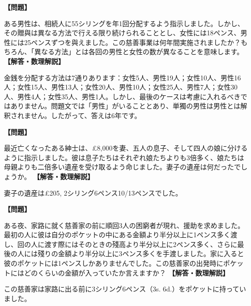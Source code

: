 \documentclass[10pt,a4paper,oneside,openany]{ltjsbook}
\begin{document}
\begin{tcolorbox}[colback=softblue,colframe=primaryblue,title=\textbf{第 6 問：慈善の遺言 （原題: A CHARITABLE BEQUEST.）},arc=2mm,boxrule=1pt,breakable]
\textbf{【問題】}\par\vspace{0.3em}
ある男性は、相続人に55シリングを年1回分配するよう指示しました。しかし、その贈與は異なる方法で行える限り続けられることとし、女性には18ペンス、男性には25ペンスずつを與えました。この慈善事業は何年間実施されましたか？もちろん、「異なる方法」とは各回の男性と女性の数が異なることを意味します。
\tcblower
\textbf{【解答・数理解説】}\par\vspace{0.3em}
金銭を分配する方法は7通りあります：女性5人、男性19人；女性10人、男性16人；女性15人、男性13人；女性20人、男性10人；女性25人、男性7人；女性30人、男性4人；女性35人、男性1人。しかし、最後のケースは考慮に入れるべきではありません。問題文では「男性」がいることとあり、単獨の男性は男性とは解釈されません。したがって、答えは6年です。
\end{tcolorbox}

\begin{tcolorbox}[colback=softblue,colframe=primaryblue,title=\textbf{第 7 問：寡婦の遺産 （原題: THE WIDOW'S LEGACY.）},arc=2mm,boxrule=1pt,breakable]
\textbf{【問題】}\par\vspace{0.3em}
最近亡くなったある紳士は、£8,000を妻、五人の息子、そして四人の娘に分けるように指示しました。彼は息子たちはそれぞれ娘たちよりも3倍多く、娘たちは母親よりも二倍多い遺産を受け取るよう命じました。妻子の遺産は何だったでしょうか。
\tcblower
\textbf{【解答・数理解説】}\par\vspace{0.3em}
妻子の遺産は£205, 2シリング6ペンス10/13ペンスでした。
\end{tcolorbox}

\begin{tcolorbox}[colback=softblue,colframe=primaryblue,title=\textbf{第 8 問：無差別な慈善行為 （原題: INDISCRIMINATE CHARITY.）},arc=2mm,boxrule=1pt,breakable]
\textbf{【問題】}\par\vspace{0.3em}
ある夜、家路に就く慈善家の前に順回3人の困窮者が現れ、援助を求めました。最初の人に彼は自分のポケットの中にある金額より半分以上に1ペンス多く渡し、回の人に渡す際にはそのときの殘高より半分以上に2ペンス多く、さらに最後の人には殘りの金額より半分以上に3ペンス多くを手渡しました。家に入ると彼のポケットには1ペンスしかありませんでした。この慈善家の出発時にポケットにはどのくらいの金額が入っていたか言えますか？
\tcblower
\textbf{【解答・数理解説】}\par\vspace{0.3em}
この慈善家は家路に出る前に3シリング6ペンス（3s. 6d.）をポケットに持っていました。
\end{tcolorbox}
\end{document}
